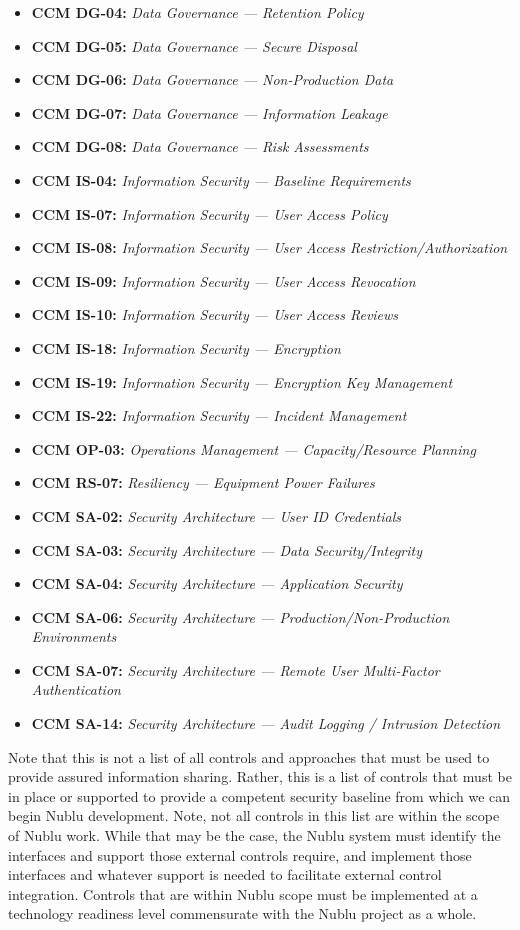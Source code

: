 \documentclass[10pt,letterpaper]{article}
\begin{document}
\begin{itemize}
\item {\bf CCM DG-04:} {\sl Data Governance --- Retention Policy}
\item {\bf CCM DG-05:} {\sl Data Governance --- Secure Disposal}
\item {\bf CCM DG-06:} {\sl Data Governance --- Non-Production Data}
\item {\bf CCM DG-07:} {\sl Data Governance --- Information Leakage}
\item {\bf CCM DG-08:} {\sl Data Governance --- Risk Assessments}
\item {\bf CCM IS-04:} {\sl Information Security --- Baseline Requirements}
\item {\bf CCM IS-07:} {\sl Information Security --- User Access Policy}
\item {\bf CCM IS-08:} {\sl Information Security --- User Access Restriction/Authorization}
\item {\bf CCM IS-09:} {\sl Information Security --- User Access Revocation}
\item {\bf CCM IS-10:} {\sl Information Security --- User Access Reviews}
\item {\bf CCM IS-18:} {\sl Information Security --- Encryption}
\item {\bf CCM IS-19:} {\sl Information Security --- Encryption Key Management}
\item {\bf CCM IS-22:} {\sl Information Security --- Incident Management}
\item {\bf CCM OP-03:} {\sl Operations Management --- Capacity/Resource Planning}
\item {\bf CCM RS-07:} {\sl Resiliency --- Equipment Power Failures}
\item {\bf CCM SA-02:} {\sl Security Architecture --- User ID Credentials}
\item {\bf CCM SA-03:} {\sl Security Architecture --- Data Security/Integrity}
\item {\bf CCM SA-04:} {\sl Security Architecture --- Application Security}
\item {\bf CCM SA-06:} {\sl Security Architecture --- Production/Non-Production Environments}
\item {\bf CCM SA-07:} {\sl Security Architecture --- Remote User Multi-Factor Authentication}
\item {\bf CCM SA-14:} {\sl Security Architecture --- Audit Logging / Intrusion Detection}
\end{itemize}

Note that this is not a list of all controls and approaches that must be used to provide assured information sharing.  Rather, this is a list of controls that must be in place or supported to provide a competent security baseline from which we can begin Nublu development.  Note, not all controls in this list are within the scope of Nublu work.  While that may be the case, the Nublu system must identify the interfaces and support those external controls require, and implement those interfaces and whatever support is needed to facilitate external control integration.  Controls that are within Nublu scope must be implemented at a technology readiness level commensurate with the Nublu project as a whole.

\end{document}

